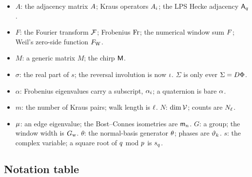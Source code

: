 \begin{itemize}
  representation and its blocks; $|V|$ is a vertex count.
  \item $A$: the adjacency matrix $A$; Kraus operators $A_{i}$; the LPS
  Hecke adjacency $\mathsf A_{q}$.
  \item $F$: the Fourier transform $\mathcal F$; Frobenius $\mathrm{Fr}$; the numerical
  window sum $F$; Weil's zero-side function $F_{\mathrm W}$.
  \item $M$: a generic matrix $M$; the chirp $\mathsf M$.
  \item $\sigma$: the real part of $s$; the reversal involution is now %
  $\iota$. $\Sigma$ is only ever $\Sigma = D\Phi$. %
  \item $\alpha$: Frobenius eigenvalues carry a subscript, $\alpha_{i}$; a %
  quaternion is bare $\alpha$.
  \item $m$: the number of Kraus pairs; walk length is $\ell$. $N$: $\dim\mathcal V$;
  counts are $N_{\ell}$.
  \item $\mu$: an edge eigenvalue; the Bost--Connes isometries are
  $\mathsf m_{n}$. $G$: a group; the window width is $G_{\mathrm w}$. $\theta$: the %
  normal-basis generator $\theta$; phases are $\vartheta_{k}$. $s$: the complex
  variable; a square root of $q$ mod $p$ is $s_q$.
\end{itemize}

\subsection{Notation table}


